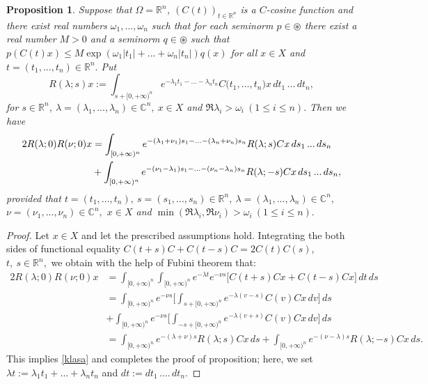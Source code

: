 \documentclass{amsart}
\newtheorem{prop}[thm]{Proposition}
\theoremstyle{definition}
\theoremstyle{remark}
\numberwithin{equation}{section}
\begin{document}
\begin{prop}\label{asd}
Suppose that $\Omega={\mathbb R}^{n}$, $(C(t))_{t\in {\mathbb R}^{n}}$ is a $C$-cosine function and there exist real numbers $\omega_{1},...,\omega_{n}$ such that for each seminorm $p\in \circledast$ there exist a real number $M>0$ and a seminorm $q\in \circledast$ such that $p(C(t)x)\leq M\exp(\omega_{1}|t_{1}|+...+\omega_{n}|t_{n}|)q(x)$ for all $x\in X$ and $t=(t_{1},...,t_{n})\in {\mathbb R}^{n}.$ Put 
$$
R(\lambda ;s)x:=\int_{s+[0,+\infty)^{n}}e^{-\lambda_{1}t_{1}-...-\lambda_{n}t_{n}}C\bigl(t_{1},...,t_{n}\bigr)x\, dt_{1}\, ...\, dt_{n},
$$
for $ s\in {\mathbb R}^{n},\ \lambda =(\lambda_{1},...,\lambda_{n}) \in {\mathbb C}^{n},\ x\in X$ and $\Re \lambda_{i} >\omega_{i}\  (1\leq i\leq n).$
Then we have
\begin{align}\notag
2R(\lambda;0)R(\nu;0) x &=\int_{[0,+\infty)^{n}}e^{-(\lambda_{1}+\nu_{1})s_{1}-...-(\lambda_{n}+\nu_{n})s_{n}}R(\lambda;s)Cx\, ds_{1}\, ...\, ds_{n} 
\\& \label{klasa}+\int_{[0,+\infty)^{n}}e^{-(\nu_{1}-\lambda_{1})s_{1}-...-(\nu_{n}-\lambda_{n})s_{n}}R(\lambda;-s)Cx\, ds_{1}\, ...\, ds_{n},
\end{align}
provided that $t=(t_{1},...,t_{n}),\ s=(s_{1},...,s_{n})\in {\mathbb R}^{n},\ \lambda =(\lambda_{1},...,\lambda_{n}) \in {\mathbb C}^{n},$ $\nu =(\nu_{1},...,\nu_{n}) \in {\mathbb C}^{n},$ $x\in X$ and $\min(\Re \lambda_{i},\Re \nu_{i}) >\omega_{i}\  (1\leq i\leq n).$
\end{prop}

\begin{proof}
Let $x\in X$ and let the prescribed assumptions hold.
Integrating the both sides of functional equality $C(t+s)C+C(t-s)C=2C(t)C(s)$, $t,\ s\in {\mathbb R}^{n},$ we obtain with the help of Fubini theorem that:
\begin{align*}
2R(\lambda;0)R(\nu;0)x &=\int_{[0,+\infty)^{n}}\int_{[0,+\infty)^{n}}e^{-\lambda t}e^{-\nu s}\bigl[ C(t+s)Cx+C(t-s)Cx \bigr]\, dt\, ds
\\& = \int_{[0,+\infty)^{n}}e^{-\nu s}\Biggl[ \int_{s+[0,+\infty)^{n}} e^{-\lambda (v-s)}C(v)Cx\, dv \Biggr]\, ds
\\& +\int_{[0,+\infty)^{n}}e^{-\nu s}\Biggl[ \int_{-s+[0,+\infty)^{n}} e^{-\lambda (v+s)}C(v)Cx\, dv \Biggr]\, ds
\\& = \int_{[0,+\infty)^{n}}e^{-(\lambda +\nu) s}R(\lambda;s)Cx\, ds + \int_{[0,+\infty)^{n}}e^{-(\nu-\lambda) s}R(\lambda;-s)Cx\, ds.
\end{align*}
This implies \eqref{klasa} and completes the proof of proposition; here, we set $\lambda t:=\lambda_{1}t_{1}+...+\lambda_{n}t_{n}$ and $dt:=dt_{1}\, ....\, dt_{n}.$
\end{proof}
\end{document}
